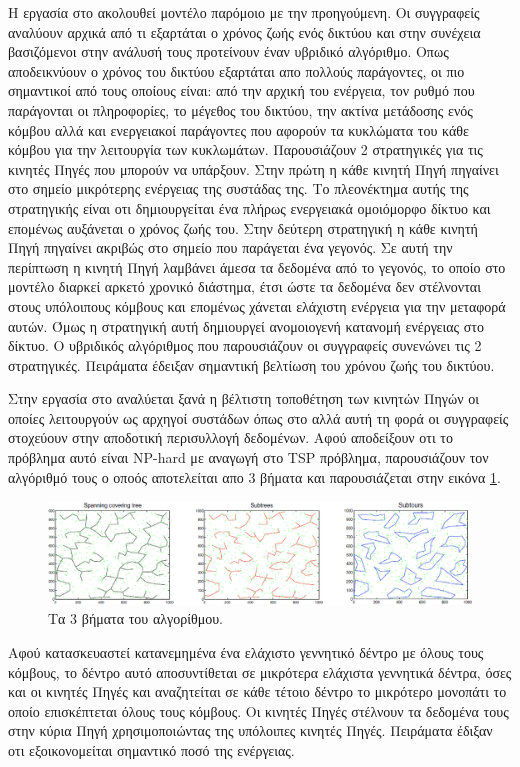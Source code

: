 Η εργασία στο \cite{event_residual_hybrid} ακολουθεί μοντέλο παρόμοιο με την προηγούμενη. Οι συγγραφείς αναλύουν αρχικά από τι εξαρτάται ο χρόνος
ζωής ενός δικτύου και στην συνέχεια βασιζόμενοι στην ανάλυσή τους προτείνουν έναν υβριδικό αλγόριθμο. Οπως αποδεικνύουν ο χρόνος του δικτύου εξαρτάται απο πολλούς
παράγοντες, οι πιο σημαντικοί από τους οποίους είναι: από την αρχική του ενέργεια, τον ρυθμό που παράγονται οι πληροφορίες, το μέγεθος του δικτύου, την ακτίνα
μετάδοσης ενός κόμβου αλλά και ενεργειακοί παράγοντες που αφορούν τα κυκλώματα του κάθε κόμβου για την λειτουργία των κυκλωμάτων. Παρουσιάζουν 2 στρατηγικές για τις
κινητές Πηγές που μπορούν να υπάρξουν. Στην πρώτη η κάθε κινητή Πηγή πηγαίνει στο σημείο μικρότερης ενέργειας της συστάδας της. Το πλεονέκτημα αυτής της στρατηγικής
είναι οτι δημιουργείται ένα πλήρως ενεργειακά ομοιόμορφο δίκτυο και επομένως αυξάνεται ο χρόνος ζωής του. Στην δεύτερη στρατηγική η κάθε κινητή Πηγή πηγαίνει ακριβώς
στο σημείο που παράγεται ένα γεγονός. Σε αυτή την περίπτωση η κινητή Πηγή λαμβάνει άμεσα τα δεδομένα από το γεγονός, το οποίο στο μοντέλο διαρκεί αρκετό χρονικό
διάστημα, έτσι ώστε τα δεδομένα δεν στέλνονται στους υπόλοιπους κόμβους και επομένως χάνεται ελάχιστη ενέργεια για την μεταφορά αυτών. Όμως η στρατηγική αυτή
δημιουργεί ανομοιογενή κατανομή ενέργειας στο δίκτυο. Ο υβριδικός αλγόριθμος που παρουσιάζουν οι συγγραφείς συνενώνει τις 2 στρατηγικές. Πειράματα έδειξαν
σημαντική βελτίωση του χρόνου ζωής του δικτύου.

Στην εργασία στο \cite{yuanyuan2} αναλύεται ξανά η βέλτιστη τοποθέτηση των κινητών Πηγών οι οποίες λειτουργούν ως αρχηγοί συστάδων όπως στο \cite{yuanyuan1} αλλά αυτή
τη φορά οι συγγραφείς στοχεύουν στην αποδοτική περισυλλογή δεδομένων. Αφού αποδείξουν οτι το πρόβλημα αυτό είναι NP-hard με αναγωγή στο TSP πρόβλημα, παρουσιάζουν τον
αλγόριθμό τους ο οποός αποτελείται απο 3 βήματα και παρουσιάζεται στην εικόνα \ref{fig:yuanyuan_mst}.
\begin{figure}[h]
	\centering
	\includegraphics[width=\textwidth]{images/yuanyuan_mst.eps}
	\caption{Τα 3 βήματα του αλγορίθμου.}
	\label{fig:yuanyuan_mst}
\end{figure}
Αφού κατασκευαστεί κατανεμημένα ένα ελάχιστο γεννητικό δέντρο με όλους τους κόμβους, το δέντρο αυτό αποσυντίθεται σε μικρότερα ελάχιστα γεννητικά δέντρα, όσες και
οι κινητές Πηγές και αναζητείται σε κάθε τέτοιο δέντρο το μικρότερο μονοπάτι το οποίο επισκέπτεται όλους τους κόμβους. Οι κινητές Πηγές στέλνουν τα δεδομένα τους
στην κύρια Πηγή χρησιμοποιώντας της υπόλοιπες κινητές Πηγές. Πειράματα έδιξαν οτι εξοικονομείται σημαντικό ποσό της ενέργειας.


